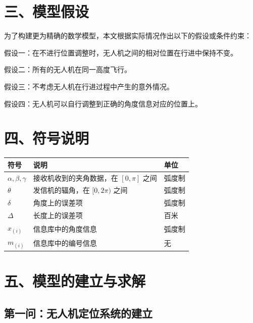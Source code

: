 \documentclass{my_paper}
\begin{document}
\section{三、模型假设}

为了构建更为精确的数学模型，本文根据实际情况作出以下的假设或条件约束：

假设一：在不进行位置调整时，无人机之间的相对位置在行进中保持不变。

假设二：所有的无人机在同一高度飞行。

假设三：不考虑无人机在行进过程中产生的意外情况。

假设四：无人机可以自行调整到正确的角度信息对应的位置上。

\newpage

\section{四、符号说明}
\begin{table}[h]%
    \centering
    \begin{tabular}{p{2.0cm}<{\centering}p{9.0cm}<{\centering}p{2.0cm}<{\centering}}
    \hline
    符号 & 说明 & 单位 \\ %
    \hline
    $\alpha,\beta,\gamma$ & 接收机收到的夹角数据，在 $[0,\pi]$ 之间 & 弧度制 \\ %
    $\theta$ & 发信机的辐角，在 $[0,2\pi)$ 之间 &  弧度制 \\ %
    $\delta$ & 角度上的误差项 & 弧度制 \\
    $\Delta$ & 长度上的误差项 & 百米 \\ %
$x_{(i)}$ & 信息库中的角度信息 & 弧度制\\
$m_{(i)}$ & 信息库中的编号信息 & 无\\
    \hline
    \end{tabular}
\end{table}


\newpage

\section{五、模型的建立与求解}

\subsection{第一问：无人机定位系统的建立}
\end{document}

